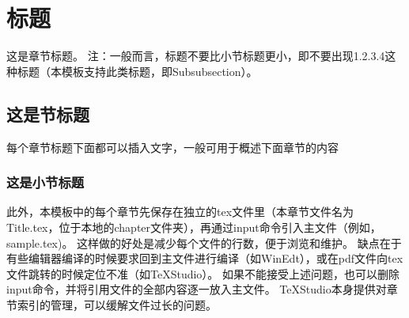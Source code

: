 \chapter{标题}

这是章节标题。
注：一般而言，标题不要比小节标题更小，即不要出现1.2.3.4这种标题（本模板支持此类标题，即Subsubsection）。

\section{这是节标题}

每个章节标题下面都可以插入文字，一般可用于概述下面章节的内容

\subsection{这是小节标题}

此外，本模板中的每个章节先保存在独立的tex文件里（本章节文件名为Title.tex，位于本地的chapter文件夹），再通过input命令引入主文件（例如，sample.tex)。
这样做的好处是减少每个文件的行数，便于浏览和维护。
缺点在于有些编辑器编译的时候要求回到主文件进行编译（如WinEdt），或在pdf文件向tex文件跳转的时候定位不准（如TeXStudio）。
如果不能接受上述问题，也可以删除input命令，并将引用文件的全部内容逐一放入主文件。
TeXStudio本身提供对章节索引的管理，可以缓解文件过长的问题。
